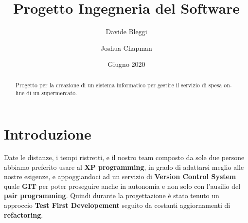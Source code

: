 \documentclass[12pt, a4paper]{article}
\title{Progetto Ingegneria del Software}
\author{Davide Bleggi \and Joshua Chapman}
\date{Giugno 2020}
\begin{document}
\begin{titlepage}
  \maketitle
\end{titlepage}

\begin{abstract}
  Progetto per la creazione di un sistema informatico per gestire il servizio 
  di spesa on-line di un supermercato.
\end{abstract}

\tableofcontents
\newpage


\section{Introduzione}
Date le distanze, i tempi ristretti, e il nostro team composto da sole due persone abbiamo preferito usare al \textbf{XP programming}, in grado di adattarsi meglio alle nostre esigenze, e appoggiandoci ad un servizio di \textbf{Version Control System} quale \textbf{GIT} per poter proseguire anche in autonomia e non solo con l'ausilio del \textbf{pair programming}. Quindi durante la progettazione è stato tenuto un approccio \textbf{Test First Developement} seguito da costanti aggiornamenti di \textbf{refactoring}.
\end{document}
